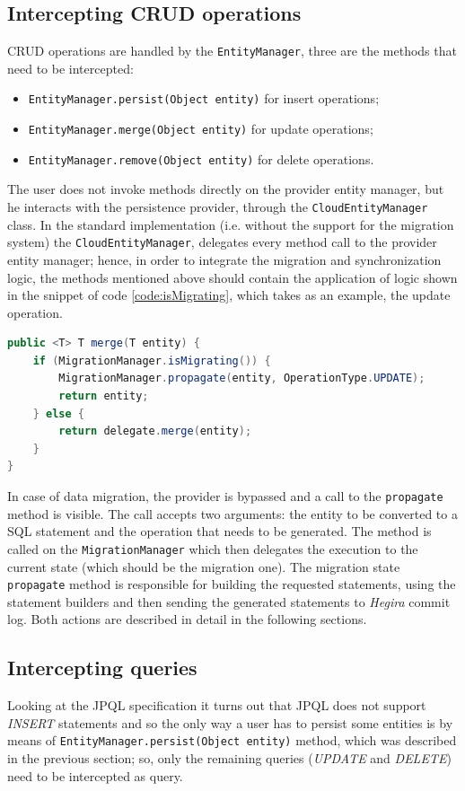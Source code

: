 \subsection{Intercepting CRUD operations}
CRUD operations are handled by the \texttt{EntityManager}, three are the methods that need to be intercepted:
\begin{itemize}
\item \texttt{EntityManager.persist(Object entity)} for insert operations;
\item \texttt{EntityManager.merge(Object entity)} for update operations;
\item \texttt{EntityManager.remove(Object entity)} for delete operations.
\end{itemize}
\noindent The user does not invoke methods directly on the provider entity manager, but he interacts with the persistence provider, through the \texttt{CloudEntityManager} class. In the standard implementation (i.e. without the support for the migration system) the \texttt{CloudEntityManager}, delegates every method call to the provider entity manager; hence, in order to integrate the  migration and synchronization logic, the methods mentioned above should contain the application of logic shown in the snippet of code \ref{code:isMigrating}, which takes as an example, the update operation.

\begin{lstlisting}[language=Java, caption=Integrate migration logic, label=code:isMigrating]
public <T> T merge(T entity) {
    if (MigrationManager.isMigrating()) {
        MigrationManager.propagate(entity, OperationType.UPDATE);
        return entity;
    } else {
        return delegate.merge(entity);
    }
}
\end{lstlisting}

\noindent In case of data migration, the provider is bypassed and a call to the \texttt{propagate} method is visible. The call accepts two arguments: the entity to be converted to a SQL statement and the operation that needs to be generated. The method is called on the \texttt{MigrationManager} which then delegates the execution to the current state (which should be the migration one). The migration state \texttt{propagate} method is responsible for building the requested statements, using the statement builders and then sending the generated statements to \textit{Hegira} commit log. Both actions are described in detail in the following sections.

\subsection{Intercepting queries}
\label{sec:cpim-intercept-queries}
Looking at the JPQL specification \cite{book:projpa2} it turns out that JPQL does not support \textit{INSERT} statements and so the only way a user has to persist some entities is by means of \texttt{EntityManager.persist(Object entity)} method, which was described in the previous section; so, only the remaining queries (\textit{UPDATE} and \textit{DELETE}) need to be intercepted as query.

